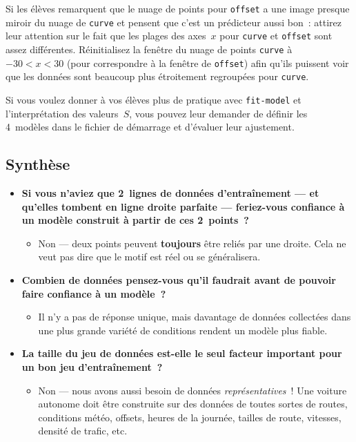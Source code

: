 \documentclass[12pt,a4paper]{article}
\begin{document}
\begin{instructornotes}
  Si les élèves remarquent que le nuage de points pour \texttt{offset} a une image presque miroir du nuage de \texttt{curve} et pensent que c'est un prédicteur aussi bon~: attirez leur attention sur le fait que les plages des axes~$x$ pour \texttt{curve} et \texttt{offset} sont assez différentes. Réinitialisez la fenêtre du nuage de points \texttt{curve} à $-30 < x < 30$ (pour correspondre à la fenêtre de \texttt{offset}) afin qu'ils puissent voir que les données sont beaucoup plus étroitement regroupées pour \texttt{curve}.

  Si vous voulez donner à vos élèves plus de pratique avec \texttt{fit-model} et l'interprétation des valeurs~$S$, vous pouvez leur demander de définir les 4~modèles dans le fichier de démarrage et d'évaluer leur ajustement.
\end{instructornotes}

\subsection{Synthèse}

\begin{thinkbox}
  \begin{itemize}
    \item \textbf{Si vous n'aviez que 2~lignes de données d'entraînement — et qu'elles tombent en ligne droite parfaite — feriez-vous confiance à un modèle construit à partir de ces 2~points~?}
    \begin{itemize}
      \item Non — deux points peuvent \textbf{toujours} être reliés par une droite. Cela ne veut pas dire que le motif est réel ou se généralisera.
    \end{itemize}
    \item \textbf{Combien de données pensez-vous qu'il faudrait avant de pouvoir faire confiance à un modèle~?}
    \begin{itemize}
      \item Il n'y a pas de réponse unique, mais davantage de données collectées dans une plus grande variété de conditions rendent un modèle plus fiable.
    \end{itemize}
    \item \textbf{La taille du jeu de données est-elle le seul facteur important pour un bon jeu d'entraînement~?}
    \begin{itemize}
      \item Non — nous avons aussi besoin de données \emph{représentatives}~! Une voiture autonome doit être construite sur des données de toutes sortes de routes, conditions météo, offsets, heures de la journée, tailles de route, vitesses, densité de trafic, etc.
    \end{itemize}
  \end{itemize}
\end{thinkbox}
\end{document}
